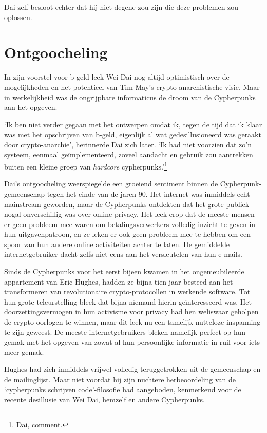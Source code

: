 \documentclass[
  a5paper,
  smalldemyvopaper,11pt,twoside,onecolumn,openright,extrafontsizes]{memoir}
\begin{document}
Dai zelf besloot echter dat hij niet degene zou zijn die deze problemen
zou oplossen.

\section{Ontgoocheling}\label{ontgoocheling}

In zijn voorstel voor b-geld leek Wei Dai nog altijd optimistisch over
de mogelijkheden en het potentieel van Tim May's crypto-anarchistische
visie. Maar in werkelijkheid was de ongrijpbare informaticus de droom
van de Cypherpunks aan het opgeven.

`Ik ben niet verder gegaan met het ontwerpen omdat ik, tegen de tijd dat
ik klaar was met het opschrijven van b-geld, eigenlijk al wat
gedesillusioneerd was geraakt door crypto-anarchie', herinnerde Dai zich
later. `Ik had niet voorzien dat zo'n systeem, eenmaal geïmplementeerd,
zoveel aandacht en gebruik zou aantrekken buiten een kleine groep van
\emph{hardcore} cypherpunks.'\footnote{Dai, comment.}

Dai's ontgoocheling weerspiegelde een groeiend sentiment binnen de
Cypherpunk-gemeenschap tegen het einde van de jaren 90. Het internet was
inmiddels echt mainstream geworden, maar de Cypherpunks ontdekten dat
het grote publiek nogal onverschillig was over online privacy. Het leek
erop dat de meeste mensen er geen probleem mee waren om
betalingsverwerkers volledig inzicht te geven in hun uitgavenpatroon, en
ze leken er ook geen probleem mee te hebben om een
\hspace{0pt}\hspace{0pt}spoor van hun andere online activiteiten achter
te laten. De gemiddelde internetgebruiker dacht zelfs niet eens aan het
versleutelen van hun e-mails.

Sinds de Cypherpunks voor het eerst bijeen kwamen in het ongemeubileerde
appartement van Eric Hughes, hadden ze bijna tien jaar besteed aan het
transformeren van revolutionaire crypto-protocollen in werkende
software. Tot hun grote teleurstelling bleek dat bijna niemand hierin
geïnteresseerd was. Het doorzettingsvermogen in hun activisme voor
privacy had hen weliswaar geholpen de crypto-oorlogen te winnen, maar
dit leek nu een tamelijk nutteloze inspanning te zijn geweest. De meeste
internetgebruikers bleken namelijk perfect op hun gemak met het opgeven
van zowat al hun persoonlijke informatie in ruil voor iets meer gemak.

Hughes had zich inmiddels vrijwel volledig teruggetrokken uit de
gemeenschap en de mailinglijst. Maar niet voordat hij zijn nuchtere
herbeoordeling van de `cypherpunks schrijven code'-filosofie had
aangeboden, kenmerkend voor de recente desillusie van Wei Dai, hemzelf
en andere Cypherpunks.
\end{document}
